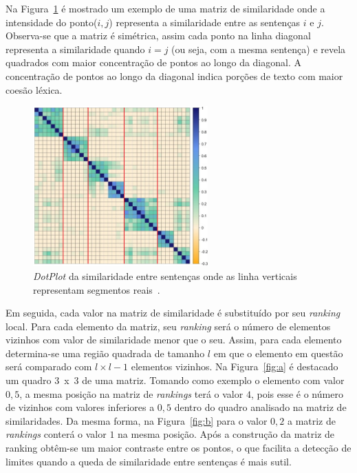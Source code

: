 
Na Figura~\ref{fig:matrix-similarity} é mostrado um exemplo de uma matriz de similaridade onde a intensidade do ponto($i,j$) representa a similaridade entre as sentenças $i$ e $j$. Observa-se que a matriz é simétrica, assim cada ponto na linha diagonal representa a similaridade quando $i = j$ (ou seja, com a mesma sentença) e revela quadrados com maior concentração de pontos ao longo da diagonal. A concentração de pontos ao longo da diagonal indica porções de texto com maior coesão léxica.


  \begin{figure}[!h]
	  \centering
	  \includegraphics[width=0.6\textwidth]{conteudo/capitulos/figs/similarity-matrix-l.png}

	  \caption{\textit{DotPlot} da similaridade entre sentenças onde as linha verticais representam segmentos reais~\cite{Eisenstein2008}.}
	  \label{fig:matrix-similarity}
  \end{figure}




Em seguida, cada valor na matriz de similaridade é substituído por seu \textit{ranking} local. Para cada elemento da matriz, seu \textit{ranking} será o número de elementos vizinhos com valor de similaridade menor que o seu. Assim, para cada elemento determina-se uma região quadrada de tamanho $l$ em que o elemento em questão será comparado com $l \times l - 1$ elementos vizinhos.
% 
% 
Na Figura~\ref{fig:a} é destacado um quadro 3~x~3 de uma matriz. Tomando como exemplo o elemento com valor $0,5$, a mesma posição na matriz de \textit{rankings} terá o valor $4$, pois esse é o número de vizinhos com valores inferiores a $0,5$ dentro do quadro analisado na matriz de similaridades. Da mesma forma, na Figura~\ref{fig:b} para o valor $0,2$ a matriz de \textit{rankings} conterá o valor $1$ na mesma posição. Após a construção da matriz de ranking obtêm-se um maior contraste entre os pontos, o que facilita a detecção de limites quando a queda de similaridade entre sentenças é mais sutil.

